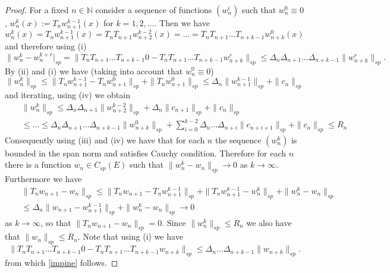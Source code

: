 \documentclass[10pt,english]{extarticle}
\begin{document}
\begin{proof}
For a fixed $n\in \mathbb{N}$ consider a sequence of functions $(w_n^i)$ such that $w_n^0\equiv 0$, $w_n^k(x):=T_nw_{n+1}^{k-1}(x)$ for $k=1,2, \ldots$. Then we have
\begin{equation}
w_n^k(x)=T_nw_{n+1}^{k-1}(x)=T_nT_{n+1}w_{n+2}^{k-2}(x)=\ldots=T_nT_{n+1}\ldots T_{n+k-1}w_{n+k}^{0}(x)
\end{equation}
and therefore using (i)
\begin{equation}
\|w_n^k-w_n^{k+r}|_{sp}= \|T_nT_{n+1}\ldots T_{n+k-1}0-T_nT_{n+1}\ldots T_{n+k-1}w_{n+k}^{r}\|_{sp}\leq  \Delta_n\Delta_{n+1}\ldots\Delta_{n+k-1}\|w_{n+k}^{r}\|_{sp}.
\end{equation}
By (ii) and (i) we have (taking into account that $w_n^0\equiv 0$)
\begin{equation}
\|w_n^k\|_{sp}\leq \|T_nw_{n+1}^{k-1} - T_nw_{n+1}^0\|_{sp}+\|T_nw_{n+1}^0\|_{sp}\leq\Delta_n \|w_{n+1}^{k-1}\|_{sp}+\|c_n\|_{sp}
\end{equation}
and iterating, using (iv) we obtain
\begin{eqnarray}
&& \|w_n^k\|_{sp}\leq \Delta_n \Delta_{n+1} \|w_{n+2}^{k-2}\|_{sp} + \Delta_n\|c_{n+1}\|_{sp}+ \|c_{n}\|_{sp}\nonumber \\ && \leq \ldots
\leq  \Delta_n \Delta_{n+1}\ldots \Delta_{n+k-1}\|w_{n+k}^0\|_{sp}+\sum_{i=0}^{k-2} \Delta_n \ldots \Delta_{n+i}\|c_{n+i+1}\|_{sp} + \|c_n\|_{sp}\leq R_n
\end{eqnarray}
Consequently using (iii) and (iv) we have that for each $n$ the sequence $(w_n^k)$ is bounded in the span norm and satisfies Cauchy condition. Therefore for each $n$ there is a function $w_n\in C_{sp}(E)$ such that $\|w_n^k-w_n\|_{sp}\to 0$ as $k\to \infty$.
Furthermore we have
\begin{eqnarray}
&&\|T_nw_{n+1} - w_{n}\|_{sp}\leq \|T_nw_{n+1} - T_nw_{n+1}^{k-1}\|_{sp}+ \|T_nw_{n+1}^{k-1}-w_n^k\|_{sp}+ \|w_n^k-w_n\|_{sp} \\
&& \leq \Delta_n \|w_{n+1}-w_{n+1}^{k-1}\|_{sp} + \|w_n^k-w_n\|_{sp}\to 0 \nonumber
\end{eqnarray}
as $k\to \infty$, so that $\|T_nw_{n+1} - w_{n}\|_{sp}=0$. Since $\|w_n^k\|_{sp}\leq R_n$ we also have that
$\|w_n\|_{sp}\leq R_n$. Note that using (i) we have
\begin{equation}
\|T_nT_{n+1}\ldots T_{n+k-1}0-T_nT_{n+1}\ldots T_{n+k-1}w_{n+k}\|_{sp}\leq \Delta_n\ldots \Delta_{n+k-1}\|w_{n+k}\|_{sp}.
\end{equation}
from which \eqref{impine} follows.


\end{proof}
\end{document}
